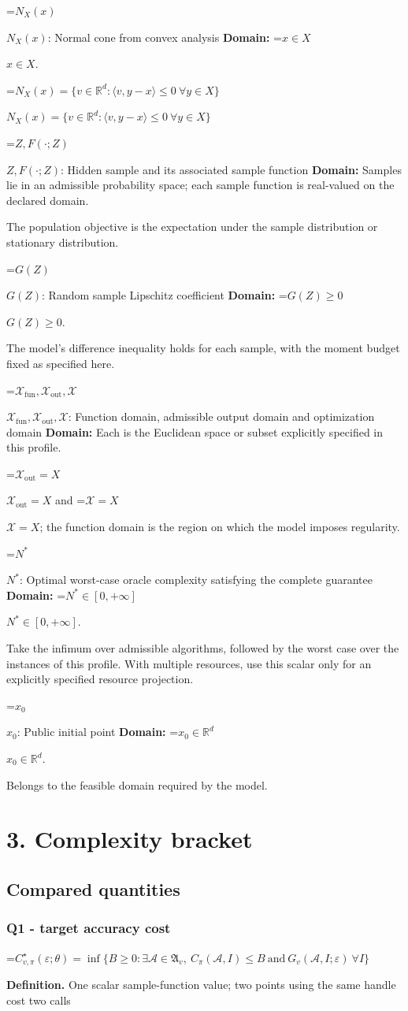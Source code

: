 \documentclass[10pt,a4paper]{article}
\newcommand{\AtlasMath}[1]{\par\begingroup\centering\setbox0=\hbox{$\displaystyle #1$}\ifdim\wd0>1.4\linewidth\typeout{ATLAS WIDE FORMULA: \the\wd0}\fi\ifdim\wd0>\linewidth\resizebox{\linewidth}{!}{\box0}\else\box0\fi\par\endgroup}
\newcommand{\AtlasInlineMath}[1]{\begingroup\setbox0=\hbox{$#1$}\ifdim\wd0>.4\linewidth\endgroup\AtlasMath{#1}\else\endgroup$#1$\fi}
\begin{document}
\AtlasInlineMath{N_X(x)}: Normal cone from convex analysis \textbf{Domain:} \AtlasInlineMath{x\in X}.

\AtlasInlineMath{N_X(x)=\{v\in\mathbb{R}^d:\langle v,y-x\rangle\le0\ \forall y\in X\}}

\AtlasInlineMath{Z,F(\cdot;Z)}: Hidden sample and its associated sample function \textbf{Domain:} Samples lie in an admissible probability space; each sample function is real-valued on the declared domain.

The population objective is the expectation under the sample distribution or stationary distribution.

\AtlasInlineMath{G(Z)}: Random sample Lipschitz coefficient \textbf{Domain:} \AtlasInlineMath{G(Z)\ge0}.

The model's difference inequality holds for each sample, with the moment budget fixed as specified here.

\AtlasInlineMath{\mathcal{X}_{\mathrm{fun}},\mathcal{X}_{\mathrm{out}},\mathcal{X}}: Function domain, admissible output domain and optimization domain \textbf{Domain:} Each is the Euclidean space or subset explicitly specified in this profile.

\AtlasInlineMath{\mathcal{X}_{\mathrm{out}}=X} and \AtlasInlineMath{\mathcal{X}=X}; the function domain is the region on which the model imposes regularity.

\AtlasInlineMath{N^*}: Optimal worst-case oracle complexity satisfying the complete guarantee \textbf{Domain:} \AtlasInlineMath{N^*\in[0,+\infty]}.

Take the infimum over admissible algorithms, followed by the worst case over the instances of this profile. With multiple resources, use this scalar only for an explicitly specified resource projection.

\AtlasInlineMath{x_0}: Public initial point \textbf{Domain:} \AtlasInlineMath{x_0\in\mathbb{R}^d}.

Belongs to the feasible domain required by the model.

\section{3. Complexity bracket}
\subsection{Compared quantities}
\subsubsection{Q1 - target accuracy cost}
\AtlasMath{C^\star_{v,\pi}(\varepsilon;\theta)=\inf\{B\ge0:\exists\mathcal A\in\mathfrak A_v,\ C_\pi(\mathcal A,I)\le B\ \text{and}\ G_v(\mathcal A,I;\varepsilon)\ \forall I\}}
\textbf{Definition.} One scalar sample-function value; two points using the same handle cost two calls
\end{document}

